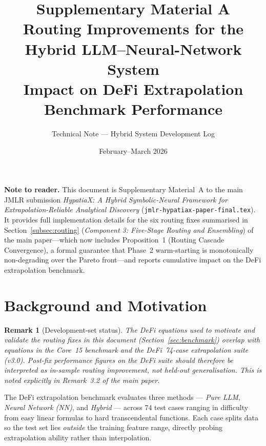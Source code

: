 \documentclass[11pt,a4paper]{article}
\newtheorem{remark}{Remark}
\begin{document}
\title{%
  \textbf{Supplementary Material A}\\[6pt]
  \textbf{Routing Improvements for the Hybrid LLM--Neural-Network System}\\[4pt]
  \large Impact on DeFi Extrapolation Benchmark Performance
}
\author{Technical Note --- Hybrid System Development Log}
\date{February--March 2026}
\maketitle
\tableofcontents
\bigskip

\noindent\textbf{Note to reader.}  This document is Supplementary Material~A to
the main JMLR submission \emph{HypatiaX: A Hybrid Symbolic-Neural Framework for
Extrapolation-Reliable Analytical Discovery} (\texttt{jmlr-hypatiax-paper-final.tex}).
It provides full implementation details for the six routing fixes summarised in Section~\ref{subsec:routing} (\emph{Component 3: Five-Stage Routing and Ensembling}) of the main paper---which now includes Proposition~1 (Routing Cascade Convergence), a formal guarantee that Phase~2 warm-starting is monotonically non-degrading over the Pareto front---and reports cumulative impact on the DeFi
extrapolation benchmark.

\section{Background and Motivation}
\label{sec:background}

\begin{remark}[Development-set status]
The DeFi equations used to motivate and validate the routing fixes in this
document (Section~\ref{sec:benchmark}) overlap with equations in the Core~15
benchmark and the DeFi~74-case extrapolation suite (v3.0).  Post-fix performance
figures on the DeFi suite should therefore be interpreted as
\emph{in-sample routing improvement}, not held-out generalisation.
This is noted explicitly in Remark~3.2 of the main paper.
\end{remark}

The DeFi extrapolation benchmark evaluates three methods --- \emph{Pure LLM},
\emph{Neural Network (NN)}, and \emph{Hybrid} --- across 74 test cases ranging
in difficulty from easy linear formulas to hard transcendental functions.
Each case splits data so the test set lies \emph{outside} the training feature
range, directly probing extrapolation ability rather than interpolation.
\end{document}
